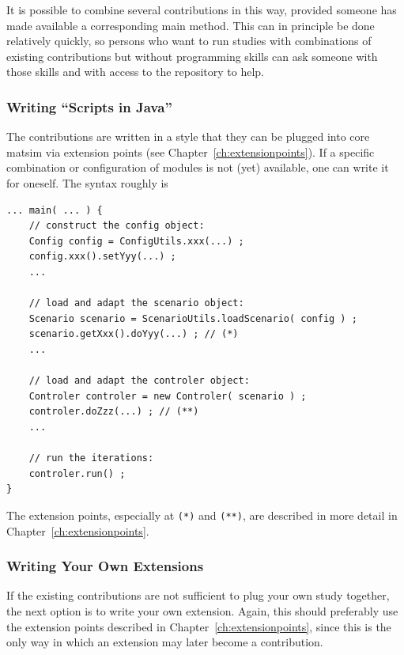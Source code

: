 It is possible to combine several \glspl{contribution} in this way, provided someone has made available a corresponding main method.  This can in principle be done relatively quickly, so persons who want to run studies with combinations of existing \glspl{contribution} but without programming skills can ask someone with those skills and with access to the repository to help.

\subsubsection{Writing ``Scripts in Java''}
\label{sec:writing-scripts-java}
The \glspl{contribution} are written in a style that they can be plugged into core \gls{matsim} via extension points (see Chapter~\ref{ch:extensionpoints}). If a specific combination or configuration of modules is not (yet) available, one can write it for oneself. The syntax roughly is
\begin{lstlisting}
... main( ... ) {
    // construct the config object:
    Config config = ConfigUtils.xxx(...) ;
    config.xxx().setYyy(...) ;
    ...

    // load and adapt the scenario object:
    Scenario scenario = ScenarioUtils.loadScenario( config ) ;
    scenario.getXxx().doYyy(...) ; // (*)
    ...

    // load and adapt the controler object:
    Controler controler = new Controler( scenario ) ;
    controler.doZzz(...) ; // (**)
    ...

    // run the iterations:
    controler.run() ;
}
\end{lstlisting}
The extension points, especially at \lstinline{(*)} and \lstinline{(**)}, are described in more detail in Chapter~\ref{ch:extensionpoints}.

\subsubsection{Writing Your Own Extensions}
\label{sec:writing-your-own-extensions}
If the existing \glspl{contribution} are not sufficient to plug your own study together, the next option is to write your own \gls{extension}.  Again, this should preferably use the extension points described in Chapter~\ref{ch:extensionpoints}, since this is the only way in which an \gls{extension} may later become a \gls{contribution}.  

